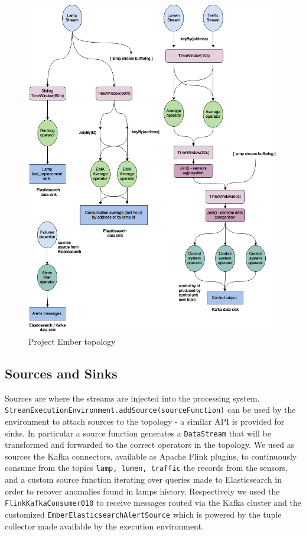 \begin{figure}
\begin{center}
	\includegraphics[scale=0.3]{img/ember_topology}
	\caption{Project Ember topology}
	\label{fig:ember_topology}
\end{center}
\end{figure}


\subsection{Sources and Sinks}
Sources are where the streams are injected into the processing system. \texttt{StreamExecutionEnvironment.addSource(sourceFunction)} can be used by the environment to attach sources to the topology - a similar API is provided for sinks. In particular a source function generates a \texttt{DataStream} that will be transformed and forwarded to the correct operators in the topology. We used as sources the Kafka connectors, available as Apache Flink plugins, to continuously consume from the topics \texttt{lamp, lumen, traffic} the records from the sensors, and a custom source function iterating over queries made to Elasticsearch in order to recover anomalies found in lamps history. Respectively we used the \texttt{FlinkKafkaConsumer010} to receive messages routed via the Kafka cluster and the customized \texttt{EmberElasticsearchAlertSource} which is powered by the tuple collector made available by the execution environment.

